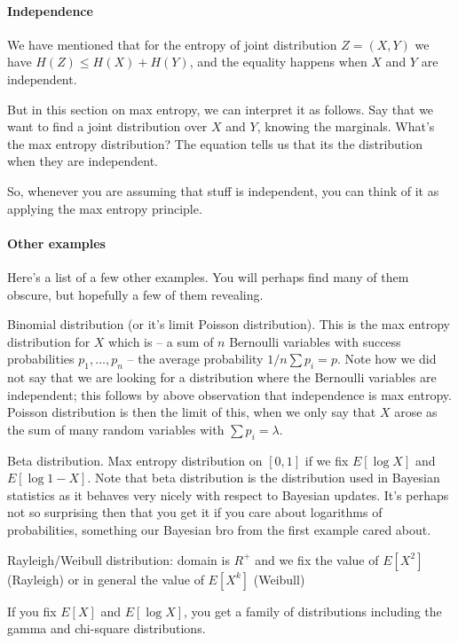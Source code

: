 \documentclass{article}
\begin{document}
\paragraph{Independence}
We have mentioned that for the entropy of joint distribution $Z = (X,Y)$ we have $H(Z) \le H(X) + H(Y)$, and the equality happens when $X$ and $Y$ are independent. 

But in this section on max entropy, we can interpret it as follows. 
Say that we want to find a joint distribution over $X$ and $Y$, knowing the marginals. What's the max entropy distribution? The equation tells us that its the distribution when they are independent. 

So, whenever you are assuming that stuff is independent, you can think of it as applying the max entropy principle. 

\paragraph{Other examples}

Here's a list of a few other examples. You will perhaps find many of them obscure, but hopefully a few of them revealing. 

Binomial distribution (or it's limit Poisson distribution). This is the max entropy distribution for $X$ which is 
-- a sum of $n$ Bernoulli variables with success probabilities $p_1, \dots, p_n$
-- the average probability $1/n \sum p_i = p$. 
Note how we did not say that we are looking for a distribution where the Bernoulli variables are independent; this follows by above observation that independence is max entropy.  Poisson distribution is then the limit of this, when we only say that $X$ arose as the sum of many random variables with $\sum p_i = \lambda$. 

Beta distribution. Max entropy distribution on $[0,1]$ if we fix $E[\log X]$ and $E[\log 1-X]$. Note that beta distribution is the distribution used in Bayesian statistics as it behaves very nicely with respect to Bayesian updates. It's perhaps not so surprising then that you get it if you care about logarithms of probabilities, something our Bayesian bro from the first example cared about. 

Rayleigh/Weibull distribution: domain is $R^+$ and we fix the value of $E[X^2]$ (Rayleigh) or in general the value of $E[X^k]$ (Weibull)  

If you fix $E[X]$ and $E[\log X]$, you get a family of distributions including the gamma and chi-square distributions. 
\end{document}
